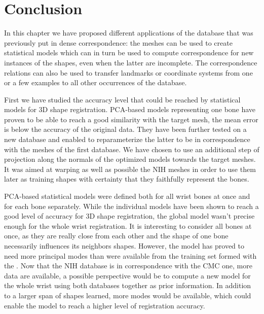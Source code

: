 \section{Conclusion}
\label{sec:4_Conclusion}

In this chapter we have proposed different applications of the database that was previously put in dense correspondence: the meshes can be used to create statistical models which can in turn be used to compute correspondence for new instances of the shapes, even when the latter are incomplete. The correspondence relations can also be used to transfer landmarks or coordinate systems from one or a few examples to all other occurrences of the database. 



First we have studied the accuracy level that could be reached by statistical models for 3D shape registration. PCA-based models representing one bone have proven to be able to reach a good similarity with the target mesh, the mean error is below the accuracy of the original data. They have been further tested on a new database and enabled to reparameterize the latter to be in correspondence with the meshes of the first database. We have chosen to use an additional step of projection along the normals of the optimized models towards the target meshes. It was aimed at warping as well as possible the NIH meshes in order to use them later as training shapes with certainty that they faithfully represent the bones. 


PCA-based statistical models were defined both for all wrist bones at once and for each bone separately. While the individual models have been shown to reach a good level of accuracy for 3D shape registration, the global model wasn't precise enough for the whole wrist registration. It is interesting to consider all bones at once, as they are really close from each other and the shape of one bone necessarily influences its neighbors shapes. However, the model has proved to need more principal modes than were available from the training set formed with the \db*. Now that the NIH database is in correspondence with the CMC one, more data are available, a possible perspective would be to compute a new model for the whole wrist using both databases together as prior information. In addition to a larger span of shapes learned, more modes would be available, which could enable the model to reach a higher level of registration accuracy. 


